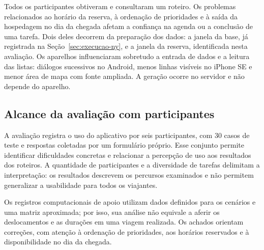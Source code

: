 Todos os participantes obtiveram e consultaram um roteiro. Os problemas relacionados ao horário da reserva, à ordenação de prioridades e à saída da hospedagem no dia da chegada afetam a confiança na agenda ou a conclusão de uma tarefa. Dois deles decorrem da preparação dos dados: a janela da base, já registrada na Seção~\ref{sec:execucao-ny}, e a janela da reserva, identificada nesta avaliação. Os aparelhos influenciaram sobretudo a entrada de dados e a leitura das listas: diálogos sucessivos no Android, menos linhas visíveis no iPhone SE e menor área de mapa com fonte ampliada. A geração ocorre no servidor e não depende do aparelho.

\subsection{Alcance da avaliação com participantes}

A avaliação registra o uso do aplicativo por seis participantes, com 30 casos de teste e respostas coletadas por um formulário próprio. Esse conjunto permite identificar dificuldades concretas e relacionar a percepção de uso aos resultados dos roteiros. A quantidade de participantes e a diversidade de tarefas delimitam a interpretação: os resultados descrevem os percursos examinados e não permitem generalizar a usabilidade para todos os viajantes.

Os registros computacionais de apoio utilizam dados definidos para os cenários e uma matriz aproximada; por isso, sua análise não equivale a aferir os deslocamentos e as durações em uma viagem realizada. Os achados orientam correções, com atenção à ordenação de prioridades, aos horários reservados e à disponibilidade no dia da chegada.
